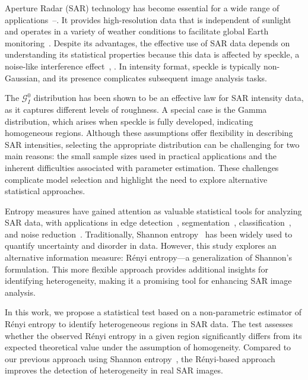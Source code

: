 \documentclass[
  journal,
]{IEEEtran}%
\begin{document}
 Aperture Radar (SAR) technology has become
essential for a wide range of
applications~--.
It provides high-resolution data that is independent of sunlight and
operates in a variety of weather conditions to facilitate global Earth
monitoring~. Despite its advantages, the
effective use of SAR data depends on understanding its statistical
properties because this data is affected by speckle, a noise-like
interference effect~,
. In intensity format, speckle is
typically non-Gaussian, and its presence complicates subsequent image
analysis tasks.

The \(\mathcal{G}^0_I\) distribution has been shown to be an effective
law for SAR intensity data, as it captures different levels of
roughness. A special case is the Gamma distribution, which arises when
speckle is fully developed, indicating homogeneous regions. Although
these assumptions offer flexibility in describing SAR intensities,
selecting the appropriate distribution can be challenging for two main
reasons: the small sample sizes used in practical applications and the
inherent difficulties associated with parameter estimation. These
challenges complicate model selection and highlight the need to explore
alternative statistical approaches.

Entropy measures have gained attention as valuable statistical tools for
analyzing SAR data, with applications in edge
detection~,
segmentation~,
classification~, and noise
reduction~. Traditionally, Shannon
entropy~ has been widely used to
quantify uncertainty and disorder in data. However, this study explores
an alternative information measure: Rényi entropy---a generalization of
Shannon's formulation. This more flexible approach provides additional
insights for identifying heterogeneity, making it a promising tool for
enhancing SAR image analysis.

In this work, we propose a statistical test based on a non-parametric
estimator of Rényi entropy to identify heterogeneous regions in SAR
data. The test assesses whether the observed Rényi entropy in a given
region significantly differs from its expected theoretical value under
the assumption of homogeneity. Compared to our previous approach using
Shannon entropy~, the Rényi-based
approach improves the detection of heterogeneity in real SAR images.
\end{document}
